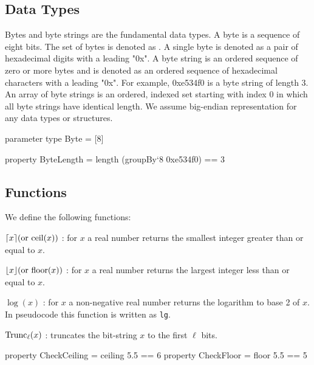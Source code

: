\subsection{Data Types}
Bytes and byte strings are the fundamental data types.  A byte is a
sequence of eight bits. The set of bytes is denoted as \byte. A single byte is
denoted as a pair of
hexadecimal digits with a leading "0x".  A byte string is an ordered
sequence of zero or more bytes and is denoted as an ordered sequence
of hexadecimal characters with a leading "0x".  For example, 0xe534f0
is a byte string of length $3$.  An array of byte strings is an
ordered, indexed set starting with index $0$ in which all byte strings
have identical length.  We assume big-endian representation for any
data types or structures.

\begin{code}
  parameter
    type Byte = [8]

  property ByteLength = length (groupBy`{8} 0xe534f0) == 3
\end{code}

\subsection{Functions}
We define the following
functions:
\begin{description}
 \item $\lceil x\rceil (\text{or }\textrm{ceil}(x))$ : for $x$ a real number returns the smallest integer greater than or equal to $x$.
 \item $\lfloor x\rfloor (\text{or }\textrm{floor}(x))$ : for $x$ a real number returns the largest integer less than or equal to $x$.
 \item $\log(x)$ : for $x$ a non-negative real number
returns the logarithm to base 2 of $x$. In pseudocode this function is written as \texttt{lg}.
 \item $\text{Trunc}_\ell(x)$ : truncates the bit-string $x$ to the first $\ell$ bits.
\end{description}

\begin{code}
  property CheckCeiling = ceiling 5.5 == 6
  property CheckFloor = floor 5.5 == 5
\end{code}

